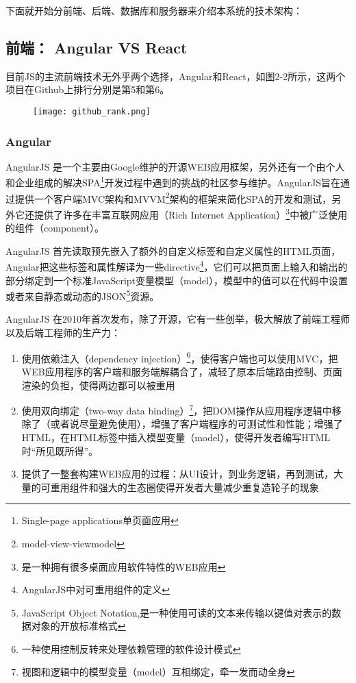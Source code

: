 下面就开始分前端、后端、数据库和服务器来介绍本系统的技术架构：
\subsection{前端： Angular VS React}
目前JS的主流前端技术无外乎两个选择，Angular和React，如图2-2所示，这两个项目在Github上排行分别是第5和第6。
\begin{figure}[!htp]
 \centering
 \texttt{[image: github\_rank.png]}
\end{figure}
\subsubsection{Angular}
AngularJS 是一个主要由Google维护的开源WEB应用框架，另外还有一个由个人和企业组成的解决SPA\footnote{Single-page applications单页面应用}开发过程中遇到的挑战的社区参与维护。AngularJS旨在通过提供一个客户端MVC架构和MVVM\footnote{model-view-viewmodel}架构的框架来简化SPA的开发和测试，另外它还提供了许多在丰富互联网应用（Rich Internet Application）\footnote{是一种拥有很多桌面应用软件特性的WEB应用 }中被广泛使用的组件（component）。

AngularJS 首先读取预先嵌入了额外的自定义标签和自定义属性的HTML页面，Angular把这些标签和属性解译为一些directive\footnote{AngularJS中对可重用组件的定义}，它们可以把页面上输入和输出的部分绑定到一个标准JavaScript变量模型（model），模型中的值可以在代码中设置或者来自静态或动态的JSON\footnote{JavaScript Object Notation,是一种使用可读的文本来传输以键值对表示的数据对象的开放标准格式}资源。

AngularJS 在2010年首次发布，除了开源，它有一些创举，极大解放了前端工程师以及后端工程师的生产力：
\begin{enumerate}
  \item 使用依赖注入（dependency injection）\footnote{一种使用控制反转来处理依赖管理的软件设计模式}，使得客户端也可以使用MVC，把WEB应用程序的客户端和服务端解耦合了，减轻了原本后端路由控制、页面渲染的负担，使得两边都可以被重用
  \item 使用双向绑定（two-way data binding）\footnote{视图和逻辑中的模型变量（model）互相绑定，牵一发而动全身}，把DOM操作从应用程序逻辑中移除了（或者说尽量避免使用），增强了客户端程序的可测试性和性能；增强了HTML，在HTML标签中插入模型变量（model），使得开发者编写HTML时“所见既所得”。
  \item 提供了一整套构建WEB应用的过程：从UI设计，到业务逻辑，再到测试，大量的可重用组件和强大的生态圈使得开发者大量减少重复造轮子的现象
\end{enumerate}

